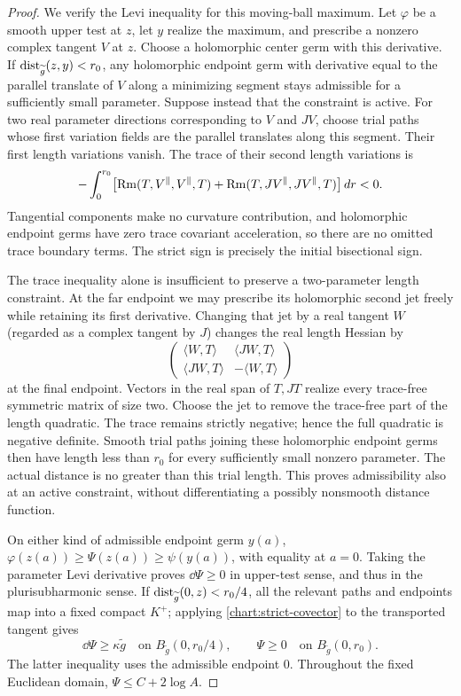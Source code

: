 \begin{proof}
We verify the Levi inequality for this moving-ball maximum.
Let $\varphi$ be a smooth upper test at $z$, let $y$ realize the
maximum, and prescribe a nonzero complex tangent $V$ at $z$.
Choose a holomorphic center germ with this derivative.  If
$\operatorname{dist}_{\widetilde g}(z,y)<r_0$, any holomorphic endpoint germ
with derivative equal to the parallel translate of $V$ along a
minimizing segment stays admissible for a sufficiently small
parameter.  Suppose instead that the constraint is active.
For two real parameter directions corresponding to $V$ and $JV$,
choose trial paths whose first variation fields are the parallel
translates along this segment.  Their first length variations
vanish.  The trace of their second length variations is
\[
 -\int_0^{r_0}
 \bigl[\operatorname{Rm}(T,V^{\parallel},V^{\parallel},T)
       +\operatorname{Rm}(T,JV^{\parallel},JV^{\parallel},T)\bigr]\,dr<0.
\]
Tangential components make no curvature contribution, and
holomorphic endpoint germs have zero trace covariant
acceleration, so there are no omitted trace boundary terms.
The strict sign is precisely the initial bisectional sign.

The trace inequality alone is insufficient to preserve a
two-parameter length constraint.  At the far endpoint we may
prescribe its holomorphic second jet freely while retaining
its first derivative.  Changing that jet by a real tangent $W$
(regarded as a complex tangent by $J$) changes the real length
Hessian by
\[
 \begin{pmatrix}
 \langle W,T\rangle&\langle JW,T\rangle\\
 \langle JW,T\rangle&-\langle W,T\rangle
 \end{pmatrix}
\]
at the final endpoint.  Vectors in the real span of $T,JT$
realize every trace-free symmetric matrix of size two.
Choose the jet to remove the trace-free part of the length
quadratic.  The trace remains
strictly negative; hence the full quadratic is negative definite.
Smooth trial paths joining these holomorphic endpoint germs
then have length less than $r_0$ for every sufficiently small
nonzero parameter.  The actual distance is no greater than this
trial length.  This proves admissibility also at an active
constraint, without differentiating a possibly nonsmooth
distance function.

On either kind of admissible endpoint germ $y(a)$,
$\varphi(z(a))\ge\Psi(z(a))\ge\psi(y(a))$, with equality at
$a=0$.  Taking the parameter Levi derivative proves
$\dd\Psi\ge0$ in upper-test sense, and thus in the
plurisubharmonic sense.  If
$\operatorname{dist}_{\widetilde g}(0,z)<r_0/4$, all the relevant paths and
endpoints map into a fixed compact $K^+$; applying
\eqref{chart:strict-covector} to the transported tangent gives
\begin{equation}\label{chart:strict-envelope}
 \dd\Psi\ge\kappa\widetilde g
 \quad\text{on }B_{\widetilde g}(0,r_0/4),
 \qquad \Psi\ge0\quad\text{on }B_{\widetilde g}(0,r_0).
\end{equation}
The latter inequality uses the admissible endpoint $0$.
Throughout the fixed Euclidean domain,
$\Psi\le C+2\log A$.


\end{proof}
